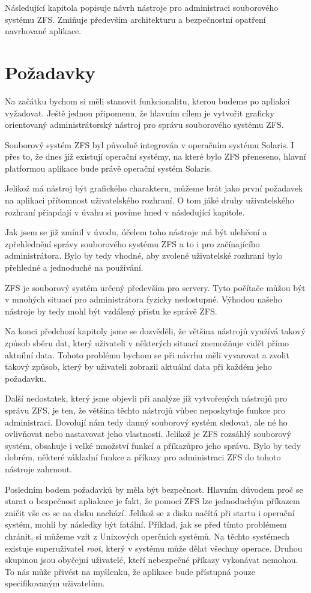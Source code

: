 Následující kapitola popisuje návrh nástroje pro administraci souborového systému ZFS. Zmiňuje především architekturu a bezpečnostní opatření navrhované aplikace.
\section{Požadavky}
Na začátku bychom si měli stanovit funkcionalitu, kterou budeme po apliakci vyžadovat. Ještě jednou připomenu, že hlavním cílem je vytvořit graficky orientovaný administrátorský nástroj pro správu souborového systému ZFS.

Souborový systém ZFS byl původně integrován v operačním systému Solaris. I přes to, že dnes již existují operační systémy, na které bylo ZFS přeneseno, hlavní platformou aplikace bude právě operační systém Solaris.

Jelikož má nástroj být grafického charakteru, můžeme brát jako první požadavek na aplikaci přítomnost uživatelského rozhraní. O tom jáké druhy uživatelského rozhraní přiapdají v úvahu si povíme hned v následující kapitole.

Jak jsem se již zmínil v úvodu, účelem toho nástroje má být ulehčení a zpřehlednění správy souborového systému ZFS a to i pro začínajícího administrátora.  Bylo by tedy vhodné, aby zvolené uživatelské rozhraní bylo přehledné a jednoduché na používání. 

ZFS je souborový systém určený především pro servery. Tyto počítače můžou být v mnohých situací pro administrátora fyzicky nedostupné. Výhodou našeho nástroje by tedy mohl být vzdálený přístu ke správě ZFS.

Na konci předchozí kapitoly jsme se dozvěděli, že většina nástrojů využívá takový způsob sběru dat, který uživateli v některých situací znemožňuje vidět přímo aktuílní data. Tohoto problému bychom se při návrhu měli vyvarovat a zvolit takový způsob, který by uživateli zobrazil aktuální data při každém jeho požadavku.

Další nedostatek, který jsme objevli při analýze již vytvořených nástrojů pro správu ZFS, je ten, že většina těchto nástrojů vůbec neposkytuje funkce pro administraci. Dovolují nám tedy danný souborový systém sledovat, ale né ho ovlivňovat nebo nastavovat jeho vlastnosti. Jelikož je ZFS rozsáhlý souborový systém, obsahuje i velké množství funkcí a příkazůpro jeho správu. Bylo by tedy dobrém, některé základní funkce a příkazy pro administraci ZFS do tohoto nástroje zahrnout.

Posledním bodem požadavků by měla být bezpečnost. Hlavním důvodem proč se starat o bezpečnost apliakace je fakt, že pomocí ZFS lze jednoduchým příkazem zničit vše co se na disku nachází. Jelikož se z disku načítá při startu i operační systém, mohli by následky být fatální. Příklad, jak se před tímto problémem chránit, si můžeme vzít z Unixových operčních systémů. Na těchto systémech existuje superuživatel \emph{root}, který v systému může dělat všechny operace. Druhou skupinou jsou obyčejní uživatelé, kteří nebezpečné příkazy vykonávat nemohou. To nás může přivést na myšlenku, že aplikace bude přístupná pouze specifikovaným uživatelům.

